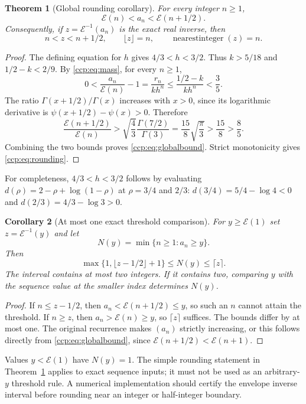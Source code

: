 \documentclass[11pt,letterpaper]{article}
\newtheorem{theorem}{Theorem}[section]
\newtheorem{corollary}[theorem]{Corollary}
\theoremstyle{remark}\newtheorem{remark}[theorem]{Remark}
\begin{document}
\begin{theorem}[Global rounding corollary]\label{ccp:thm:rounding}
For every integer $n\ge1$,
\begin{equation}
\mathcal E(n)<a_n<\mathcal E(n+1/2).\label{ccp:eq:globalbound}
\end{equation}
Consequently, if $z=\mathcal E^{-1}(a_n)$ is the exact real inverse, then
\begin{equation}
n<z<n+1/2,\qquad \lfloor z\rfloor=n,
\qquad\operatorname{nearestinteger}(z)=n.\label{ccp:eq:rounding}
\end{equation}
\end{theorem}
\begin{proof}
The defining equation for $h$ gives $4/3<h<3/2$. Thus $k>5/18$ and $1/2-k<2/9$. By \eqref{ccp:eq:mass}, for every $n\ge1$,
\[
0<\frac{a_n}{\mathcal E(n)}-1
 =\frac{r_n}{kh^n}
 \le\frac{1/2-k}{kh^n}<\frac35.
\]
The ratio $\Gamma(x+1/2)/\Gamma(x)$ increases with $x>0$, since its logarithmic derivative is $\psi(x+1/2)-\psi(x)>0$. Therefore
\[
\frac{\mathcal E(n+1/2)}{\mathcal E(n)}
 >\sqrt{\frac43}\frac{\Gamma(7/2)}{\Gamma(3)}
 =\frac{15}{8}\sqrt{\frac\pi3}>\frac{15}{8}>\frac85.
\]
Combining the two bounds proves \eqref{ccp:eq:globalbound}. Strict monotonicity gives \eqref{ccp:eq:rounding}.
\end{proof}

For completeness, $4/3<h<3/2$ follows by evaluating $d(\rho)=2-\rho+\log(1-\rho)$ at $\rho=3/4$ and $2/3$: $d(3/4)=5/4-\log4<0$ and $d(2/3)=4/3-\log3>0$.

\begin{corollary}[At most one exact threshold comparison]\label{ccp:cor:threshold}
For $y\ge\mathcal E(1)$ set $z=\mathcal E^{-1}(y)$ and let
\[
N(y)=\min\{n\ge1:a_n\ge y\}.
\]
Then
\begin{equation}
\max\{1,\lfloor z-1/2\rfloor+1\}\le N(y)\le\lceil z\rceil.\label{ccp:eq:threshold}
\end{equation}
The interval contains at most two integers. If it contains two, comparing $y$ with the sequence value at the smaller index determines $N(y)$.
\end{corollary}
\begin{proof}
If $n\le z-1/2$, then $a_n<\mathcal E(n+1/2)\le y$, so such an $n$ cannot attain the threshold. If $n\ge z$, then $a_n>\mathcal E(n)\ge y$, so $\lceil z\rceil$ suffices. The bounds differ by at most one. The original recurrence makes $(a_n)$ strictly increasing, or this follows directly from \eqref{ccp:eq:globalbound}, since $\mathcal E(n+1/2)<\mathcal E(n+1)$.
\end{proof}
Values $y<\mathcal E(1)$ have $N(y)=1$. The simple rounding statement in Theorem~\ref{ccp:thm:rounding} applies to exact sequence inputs; it must not be used as an arbitrary-$y$ threshold rule. A numerical implementation should certify the envelope inverse interval before rounding near an integer or half-integer boundary.
\end{document}
